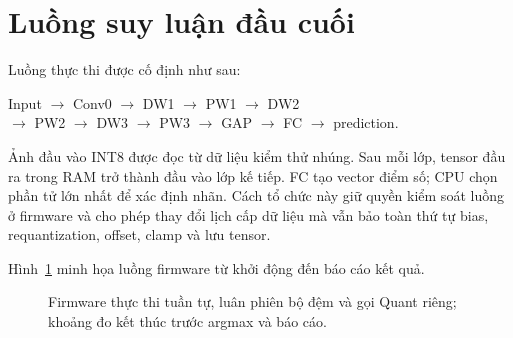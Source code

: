\section{Luồng suy luận đầu cuối}
Luồng thực thi được cố định như sau:
\begin{center}
Input $\rightarrow$ Conv0 $\rightarrow$ DW1 $\rightarrow$ PW1 $\rightarrow$ DW2\\
$\rightarrow$ PW2 $\rightarrow$ DW3 $\rightarrow$ PW3 $\rightarrow$ GAP $\rightarrow$ FC $\rightarrow$ prediction.
\end{center}
Ảnh đầu vào INT8 được đọc từ dữ liệu kiểm thử nhúng. Sau mỗi lớp, tensor đầu ra trong RAM trở thành đầu vào lớp kế tiếp. FC tạo vector điểm số; CPU chọn phần tử lớn nhất để xác định nhãn. Cách tổ chức này giữ quyền kiểm soát luồng ở firmware và cho phép thay đổi lịch cấp dữ liệu mà vẫn bảo toàn thứ tự bias, requantization, offset, clamp và lưu tensor.

Hình~\ref{fig:flow-placeholder} minh họa luồng firmware từ khởi động đến báo cáo kết quả.

\begin{figure}[!ht]
\captionsetup{aboveskip=6pt,belowskip=0pt}
\centering
\resizebox{0.93\textwidth}{!}{}
\caption{Firmware thực thi tuần tự, luân phiên bộ đệm và gọi Quant riêng; khoảng đo kết thúc trước argmax và báo cáo.}
\label{fig:flow-placeholder}
\end{figure}
